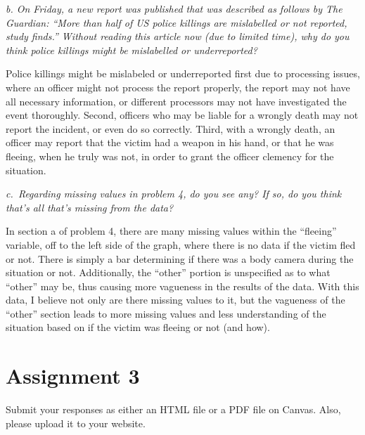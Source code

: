 \documentclass[
]{article}
\newenvironment{Shaded}{\begin{snugshade}}{\end{snugshade}}
\newcommand{\AttributeTok}[1]{\textcolor[rgb]{0.77,0.63,0.00}{#1}}
\newcommand{\ConstantTok}[1]{\textcolor[rgb]{0.00,0.00,0.00}{#1}}
\newcommand{\FunctionTok}[1]{\textcolor[rgb]{0.00,0.00,0.00}{#1}}
\newcommand{\NormalTok}[1]{#1}
\newcommand{\SpecialCharTok}[1]{\textcolor[rgb]{0.00,0.00,0.00}{#1}}
\begin{document}
\emph{b. On Friday, a new report was published that was described as
follows by The Guardian: ``More than half of US police killings are
mislabelled or not reported, study finds.'' Without reading this article
now (due to limited time), why do you think police killings might be
mislabelled or underreported?}

Police killings might be mislabeled or underreported first due to
processing issues, where an officer might not process the report
properly, the report may not have all necessary information, or
different processors may not have investigated the event thoroughly.
Second, officers who may be liable for a wrongly death may not report
the incident, or even do so correctly. Third, with a wrongly death, an
officer may report that the victim had a weapon in his hand, or that he
was fleeing, when he truly was not, in order to grant the officer
clemency for the situation.

\emph{c.~Regarding missing values in problem 4, do you see any? If so,
do you think that's all that's missing from the data?}

In section a of problem 4, there are many missing values within the
``fleeing'' variable, off to the left side of the graph, where there is
no data if the victim fled or not. There is simply a bar determining if
there was a body camera during the situation or not. Additionally, the
``other'' portion is unspecified as to what ``other'' may be, thus
causing more vagueness in the results of the data. With this data, I
believe not only are there missing values to it, but the vagueness of
the ``other'' section leads to more missing values and less
understanding of the situation based on if the victim was fleeing or not
(and how).

\hypertarget{assignment-3}{%
\section{Assignment 3}\label{assignment-3}}

\begin{Shaded}
\end{Shaded}

Submit your responses as either an HTML file or a PDF file on Canvas.
Also, please upload it to your website.
\end{document}
